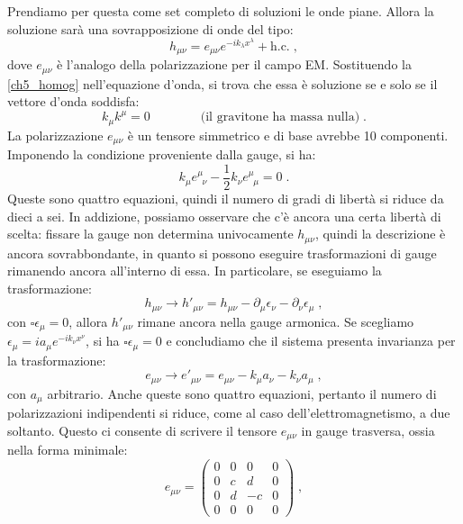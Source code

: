 \documentclass[12pt,a4paper]{report}
\theoremstyle{definition}
\begin{document}
Prendiamo per questa come set completo di soluzioni le onde piane. Allora la soluzione sarà una sovrapposizione di onde del tipo:
\begin{equation}
h_{\mu\nu}=e_{\mu\nu}e^{-ik_{\lambda}x^{\lambda}}+\mathrm{h.c.} \;, \label{ch5_homog}
\end{equation}
dove $e_{\mu\nu}$ è l'analogo della polarizzazione per il campo EM. Sostituendo la \eqref{ch5_homog} nell'equazione d'onda, si trova che essa è soluzione se e solo se il vettore d'onda soddisfa:
\begin{equation}
k_{\mu}k^{\mu}=0\qquad\qquad\mbox{(il gravitone ha massa nulla)}\;.
\end{equation}
La polarizzazione $e_{\mu\nu}$ è un tensore simmetrico e di base avrebbe 10 componenti. Imponendo la condizione proveniente dalla gauge, si ha:
\begin{equation}
k_{\mu}e^{\mu}_{\;\;\nu}-\frac{1}{2}k_{\nu}e^{\mu}_{\;\;\mu}=0\;.
\end{equation}
Queste sono quattro equazioni, quindi il numero di gradi di libertà si riduce da dieci a sei. In addizione, possiamo osservare che c'è ancora una certa libertà di scelta: fissare la gauge non determina univocamente $h_{\mu\nu}$, quindi la descrizione è ancora sovrabbondante, in quanto si possono eseguire trasformazioni di gauge rimanendo ancora all'interno di essa. In particolare, se eseguiamo la trasformazione:
$$
h_{\mu\nu}\to h'_{\mu\nu}=h_{\mu\nu}-\partial_{\mu}\epsilon_{\nu}-\partial_{\nu}\epsilon_{\mu}\;,
$$
con $\square\epsilon_{\mu}=0$, allora $h'_{\mu\nu}$ rimane ancora nella gauge armonica. Se scegliamo $\epsilon_{\mu}=ia_{\mu}e^{-ik_{\nu}x^{\nu}}$, si ha $\square\epsilon_{\mu}=0$ e concludiamo che il sistema presenta invarianza per la trasformazione:
\begin{equation}
e_{\mu\nu}\longrightarrow e'_{\mu\nu}=e_{\mu\nu}-k_{\mu}a_{\nu}-k_{\nu}a_{\mu}\;,
\end{equation}
con $a_{\mu}$ arbitrario. Anche queste sono quattro equazioni, pertanto il numero di polarizzazioni indipendenti si riduce, come al caso dell'elettromagnetismo, a due soltanto. Questo ci consente di scrivere il tensore $e_{\mu\nu}$ in gauge trasversa, ossia nella forma minimale:
\begin{equation}
e_{\mu\nu}=\left(\begin{matrix}
0 & 0 & 0 & 0 \\
0 & c & d & 0 \\
0 & d & -c & 0 \\
0 & 0 & 0 & 0
\end{matrix}\right)\;,
\end{equation}
\end{document}
